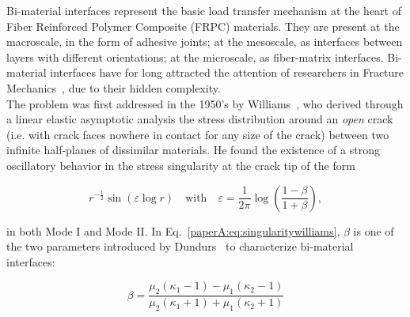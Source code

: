 Bi-material interfaces represent the basic load transfer mechanism at the heart of Fiber Reinforced Polymer Composite (FRPC) materials. They are present at the macroscale, in the form of adhesive joints; at the mesoscale, as interfaces between layers with different orientations; at the microscale, as fiber-matrix interfaces. Bi-material interfaces have for long attracted the attention of researchers in Fracture Mechanics~\cite{Comninou1990,Hills1993}, due to their hidden complexity.\\
The problem was first addressed in the 1950's by Williams~\cite{Williams1959}, who derived through a linear elastic asymptotic analysis the stress distribution around an \emph{open} crack (i.e. with crack faces nowhere in contact for any size of the crack) between two infinite half-planes of dissimilar materials. He found the existence of a strong oscillatory behavior in the stress singularity at the crack tip of the form

\begin{equation}\label{paperA:eq:singularitywilliams}
r^{-\frac{1}{2}}\sin\left(\varepsilon\log r\right)\quad\text{with}\quad\varepsilon=\frac{1}{2\pi}\log\left(\frac{1-\beta}{1+\beta}\right),
\end{equation}

in both Mode I and Mode II. In Eq.~\ref{paperA:eq:singularitywilliams}, $\beta$ is one of the two parameters introduced by Dundurs~\cite{Dundurs1969} to characterize bi-material interfaces:

\begin{equation}\label{paperA:eq:dundursbeta}
\beta=\frac{\mu_{2}\left(\kappa_{1}-1\right)-\mu_{1}\left(\kappa_{2}-1\right)}{\mu_{2}\left(\kappa_{1}+1\right)+\mu_{1}\left(\kappa_{2}+1\right)}
\end{equation}

